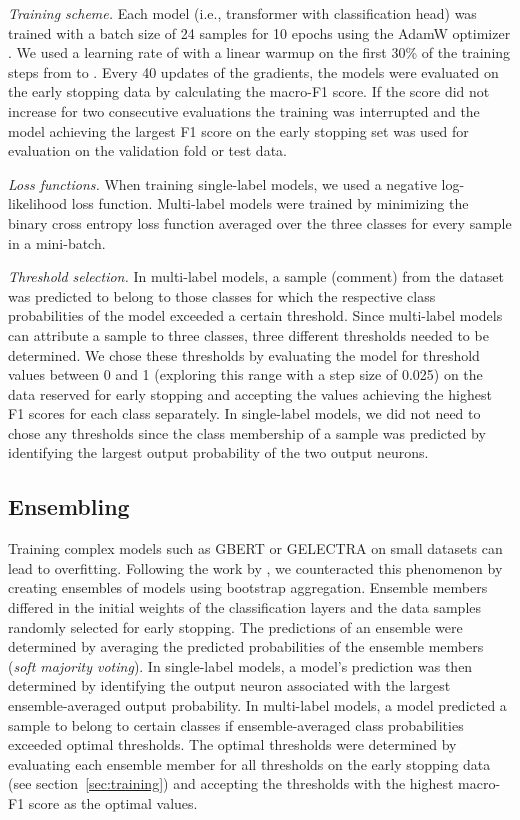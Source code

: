 \documentclass[11pt,a4paper]{article}
\begin{document}
\emph{Training scheme.} Each model (i.e., transformer with classification head) was trained with a batch size of 24 samples for 10 epochs using the AdamW optimizer \cite{Loshchilov2019}.
We used a learning rate of  with a linear warmup on the first 30\% of the training steps from  to .
Every 40 updates of the gradients, the models were evaluated on the early stopping data by calculating the macro-F1 score.
If the score did not increase for two consecutive evaluations the training was interrupted and the model achieving the largest F1 score on the early stopping set was used for evaluation on the validation fold or test data.

\emph{Loss functions.} When training single-label models, we used a negative log-likelihood loss function.
Multi-label models were trained by minimizing the binary cross entropy loss function averaged over the three classes for every sample in a mini-batch.

\emph{Threshold selection.} In multi-label models, a sample (comment) from the dataset was predicted to belong to those classes for which the respective class probabilities of the model exceeded a certain threshold.
Since multi-label models can attribute a sample to three classes, three different thresholds needed to be determined.
We chose these thresholds by evaluating the model for threshold values between 0 and 1 (exploring this range with a step size of 0.025) on the data reserved for early stopping and accepting the values achieving the highest F1 scores for each class separately.
In single-label models, we did not need to chose any thresholds since the class membership of a sample was predicted by identifying the largest output probability of the two output neurons.


\subsection{Ensembling}
\label{ssec:ensembling}

Training complex models such as GBERT or GELECTRA on small datasets can lead to overfitting.
Following the work by \citet{Risch2020}, we counteracted this phenomenon by creating ensembles of models using bootstrap aggregation.
Ensemble members differed in the initial weights of the classification layers and the data samples randomly selected for early stopping.
The predictions of an ensemble were determined by averaging the predicted probabilities of the ensemble members (\emph{soft majority voting}).
In single-label models, a model's prediction was then determined by identifying the output neuron associated with the largest ensemble-averaged output probability.
In multi-label models, a model predicted a sample to belong to certain classes if ensemble-averaged class probabilities exceeded optimal thresholds.
The optimal thresholds were determined by evaluating each ensemble member for all thresholds on the early stopping data (see section~\ref{sec:training}) and accepting the thresholds with the highest macro-F1 score as the optimal values.
\end{document}
